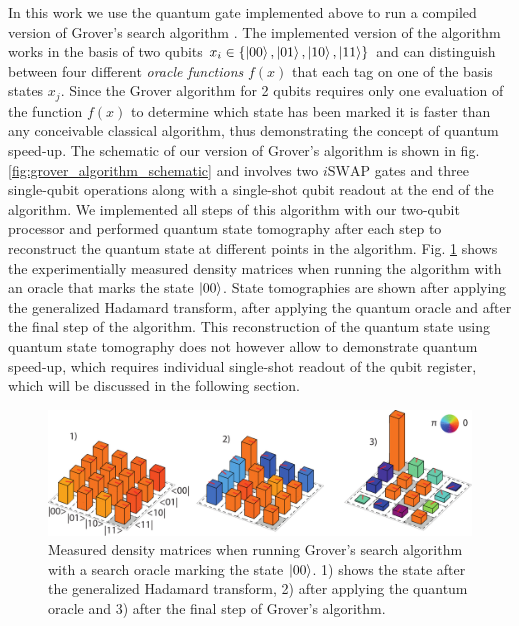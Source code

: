 In this work we use the quantum gate implemented above to run a compiled version of Grover's search algorithm \citep{Grover_Quantum_1997}. The implemented version of the algorithm works in the basis of two qubits $x_i \in \{\left| 00 \right>,\left| 01 \right>,\left| 10 \right>,\left| 11 \right>\}$ and  can distinguish between four different {\it oracle functions} $f(x)$ that each tag on one of the basis states $x_j$. Since the Grover algorithm for 2 qubits requires only one evaluation of the function $f(x)$ to determine which state has been marked it is faster than any conceivable classical algorithm, thus demonstrating the concept of quantum speed-up. The schematic of our version of Grover's algorithm is shown in fig. \ref{fig:grover_algorithm_schematic} and involves two $i\mathrm{SWAP}$ gates and three single-qubit operations along with a single-shot qubit readout at the end of the algorithm. We implemented all steps of this algorithm with our two-qubit processor and performed quantum state tomography after each step to reconstruct the quantum state at different points in the algorithm. Fig. \ref{fig:grover_density_matrices_state_1} shows the experimentially measured density matrices when running the algorithm with an oracle that marks the state $\left| 00 \right>$. State tomographies are shown after applying the generalized Hadamard transform, after applying the quantum oracle and after the final step of the algorithm. This reconstruction of the quantum state using quantum state tomography does not however allow to demonstrate quantum speed-up, which requires individual single-shot readout of the qubit register, which will be discussed in the following section.

\begin{figure}[ht!]
	\centering
		\includegraphics[width=1.\textwidth]{./material/figures/2-qubit-processor/grover/grover-density-matrices-state-1}
	\caption[Measured density matrices when running Grover's algorithm]{Measured density matrices when running Grover's search algorithm with a search oracle marking the state $\left| 00 \right>$. 1) shows the state after the generalized Hadamard transform, 2) after applying the quantum oracle and 3) after the final step of Grover's algorithm.} 
	\label{fig:grover_density_matrices_state_1}
\end{figure}


